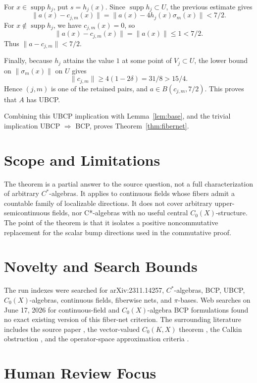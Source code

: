 \documentclass[11pt]{article}
\newcommand{\supp}{\operatorname{supp}}
\begin{document}
For \(x\in\supp h_j\), put \(s=h_j(x)\).  Since \(\supp h_j\subset U\), the
previous estimate gives
\[
        \|a(x)-c_{j,m}(x)\|
        =
        \|a(x)-4h_j(x)\sigma_m(x)\|
        <7/2.
\]
For \(x\notin\supp h_j\), we have \(c_{j,m}(x)=0\), so
\[
        \|a(x)-c_{j,m}(x)\|=\|a(x)\|\le1<7/2.
\]
Thus \(\|a-c_{j,m}\|<7/2\).

Finally, because \(h_j\) attains the value \(1\) at some point of \(V_j\subset
U\), the lower bound on \(\|\sigma_m(x)\|\) on \(U\) gives
\[
        \|c_{j,m}\|\ge 4(1-2\delta)=31/8>15/4.
\]
Hence \((j,m)\) is one of the retained pairs, and \(a\in B(c_{j,m},7/2)\).
This proves that \(A\) has UBCP.

Combining this UBCP implication with Lemma~\ref{lem:base}, and the trivial
implication UBCP \(\Rightarrow\) BCP, proves Theorem~\ref{thm:fibernet}.

\section*{Scope and Limitations}

The theorem is a partial answer to the source question, not a full
characterization of arbitrary \(C^*\)-algebras.  It applies to continuous
fields whose fibers admit a countable family of localizable directions.  It
does not cover arbitrary upper-semicontinuous fields, nor C*-algebras with no
useful central \(C_0(X)\)-structure.  The point of the theorem is that it
isolates a positive noncommutative replacement for the scalar bump directions
used in the commutative proof.

\section*{Novelty and Search Bounds}

The run indexes were searched for arXiv:2311.14257, \(C^*\)-algebras, BCP,
UBCP, \(C_0(X)\)-algebras, continuous fields, fiberwise nets, and
\(\pi\)-bases.  Web searches on June 17, 2026 for continuous-field and
\(C_0(X)\)-algebra BCP formulations found no exact existing version of this
fiber-net criterion.  The surrounding literature includes the source paper
\cite{HKL}, the vector-valued \(C_0(K,X)\) theorem \cite{LLLZ}, the Calkin
obstruction \cite{BLS}, and the operator-space approximation criteria
\cite{BLS2}.

\section*{Human Review Focus}
\end{document}
